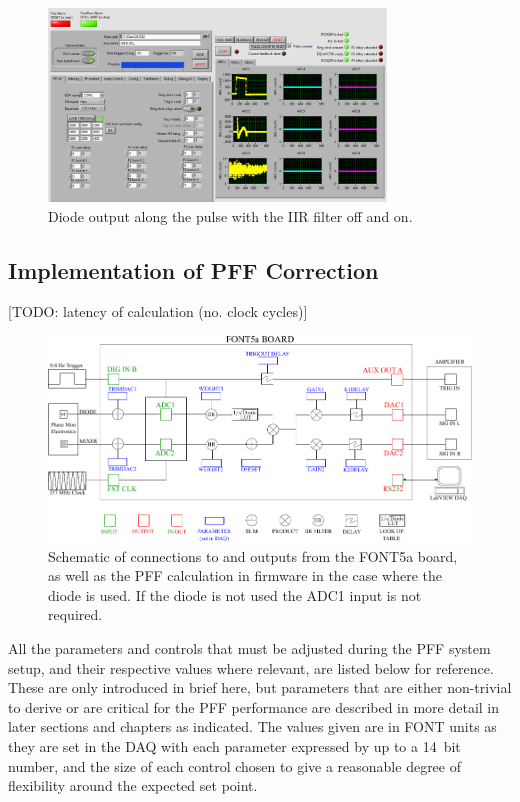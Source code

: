 \begin{figure}
  \centering
  \includegraphics[width=0.8\textwidth]{Figures/commissioning/DAQScreenshot}
  \caption{Diode output along the pulse with the IIR filter off and on.}
  \label{f:DAQScreenshot}
\end{figure}

\subsection{Implementation of PFF Correction}
\label{ss:pffFirmware}

[TODO: latency of calculation (no. clock cycles)]

\begin{landscape}
\begin{figure}
  \centering
  \includegraphics[width=\hsize]{Figures/commissioning/fontDiagram}
  \caption{Schematic of connections to and outputs from the FONT5a board, as well as the PFF calculation in firmware in the case where the diode is used. If the diode is not used the ADC1 input is not required. }
  \label{f:fontDiagram}
\end{figure}
\end{landscape}

All the parameters and controls that must be adjusted during the PFF system setup, and their respective values where relevant, are listed below for reference. These are only introduced in brief here, but parameters that are either non-trivial to derive or are critical for the PFF performance are described in more detail in later sections and chapters as indicated. The values given are in FONT units as they are set in the DAQ with each parameter expressed by up to a 14~bit number, and the size of each control chosen to give a reasonable degree of flexibility around the expected set point. 

